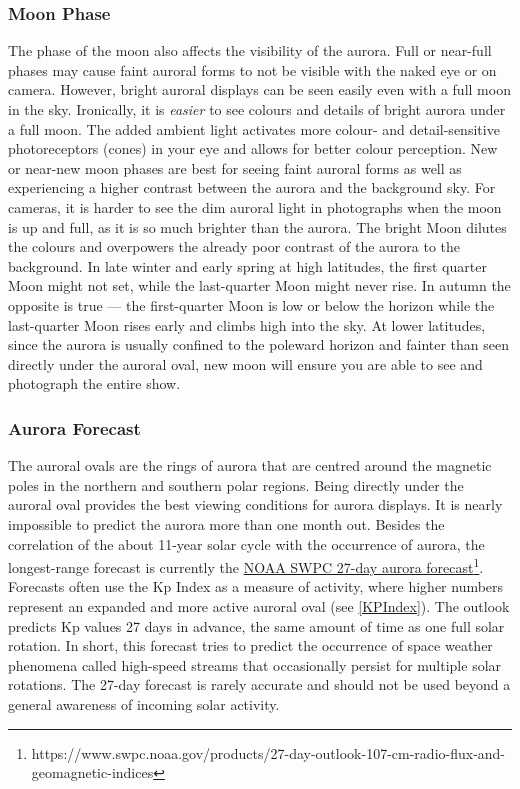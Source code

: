 \documentclass{article}
\begin{document}
\subsubsection{Moon Phase}
The phase of the moon also affects the visibility of the aurora. Full or near-full phases may cause faint auroral forms to not be visible with the naked eye or on camera. However, bright auroral displays can be seen easily even with a full moon in the sky. Ironically, it is \textit{easier} to see colours and details of bright aurora under a full moon. The added ambient light activates more colour- and detail-sensitive photoreceptors (cones) in your eye and allows for better colour perception. New or near-new moon phases are best for seeing faint auroral forms as well as experiencing a higher contrast between the aurora and the background sky. For cameras, it is harder to see the dim auroral light in photographs when the moon is up and full, as it is so much brighter than the aurora. The bright Moon dilutes the colours and overpowers the already poor contrast of the aurora to the background. In late winter and early spring at high latitudes, the first quarter Moon might not set, while the last-quarter Moon might never rise. In autumn the opposite is true — the first-quarter Moon is low or below the horizon while the last-quarter Moon rises early and climbs high into the sky. At lower latitudes, since the aurora is usually confined to the poleward horizon and fainter than seen directly under the auroral oval, new moon will ensure you are able to see and photograph the entire show.

\subsubsection{Aurora Forecast}
The auroral ovals are the rings of aurora that are centred around the magnetic poles in the northern and southern polar regions. Being directly under the auroral oval provides the best viewing conditions for aurora displays. It is nearly impossible to predict the aurora more than one month out. Besides the correlation of the about 11-year solar cycle with the occurrence of aurora, the longest-range forecast is currently the \href{https://www.swpc.noaa.gov/products/27-day-outlook-107-cm-radio-flux-and-geomagnetic-indices}{NOAA SWPC 27-day aurora forecast}\footnote{https://www.swpc.noaa.gov/products/27-day-outlook-107-cm-radio-flux-and-geomagnetic-indices}. Forecasts often use the Kp Index as a measure of activity, where higher numbers represent an expanded and more active auroral oval (see \ref{KPIndex}). The outlook predicts Kp values 27 days in advance, the same amount of time as one full solar rotation. In short, this forecast tries to predict the occurrence of space weather phenomena called high-speed streams that occasionally persist for multiple solar rotations. The 27-day forecast is rarely accurate and should not be used beyond a general awareness of incoming solar activity.
\end{document}
